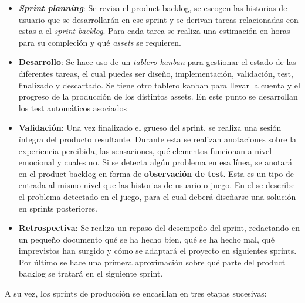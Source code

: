 \begin{itemize}
    \item \textbf{\textit{Sprint planning}}: Se revisa el product backlog, se escogen las historias de usuario que se desarrollarán en ese sprint y se derivan tareas relacionadas con estas a el \textit{sprint backlog}. Para cada tarea se realiza una estimación en horas para su compleción y qué \textit{assets} se requieren.
    \item \textbf{Desarrollo}: Se hace uso de un \textit{tablero kanban} para gestionar el estado de las diferentes tareas, el cual puedes ser diseño, implementación, validación, test, finalizado y descartado. Se tiene otro tablero kanban para llevar la cuenta y el progreso de la producción de los distintos assets. En este punto se desarrollan los test automáticos asociados 
    \item \textbf{Validación}: Una vez finalizado el grueso del sprint, se realiza una sesión íntegra del producto resultante. Durante esta se realizan anotaciones sobre la experiencia percibida, las sensaciones, qué elementos funcionan a nivel emocional y cuales no. Si se detecta algún problema en esa línea, se anotará en el product backlog en forma de \textbf{observación de test}. Esta es un tipo de entrada al mismo nivel que las historias de usuario o juego. En el se describe el problema detectado en el juego, para el cual deberá diseñarse una solución en sprints posteriores.
    \item \textbf{Retrospectiva}: Se realiza un repaso del desempeño del sprint, redactando en un pequeño documento qué se ha hecho bien, qué se ha hecho mal, qué imprevistos han surgido y cómo se adaptará el proyecto en siguientes sprints. Por último se hace una primera aproximación sobre qué parte del product backlog se tratará en el siguiente sprint.
\end{itemize}

A su vez, los sprints de producción se encasillan en tres etapas sucesivas:

